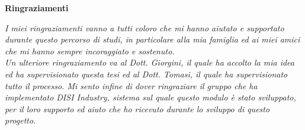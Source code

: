 \thispagestyle{empty}

\begin{center}
  {\bf \Huge Ringraziamenti}
\end{center}

\vspace{4cm}


\emph{
    I miei ringraziamenti vanno a tutti coloro che mi hanno aiutato e supportato durante questo percorso di studi, in particolare alla mia famiglia ed ai miei amici che mi hanno sempre incoraggiato e sostenuto.\\ Un ulteriore ringraziamento va al Dott. Giorgini, il quale ha accolto la mia idea ed ha supervisionato questa tesi ed al Dott. Tomasi, il quale ha supervisionato tutto il processo. Mi sento infine di dover ringraziare il gruppo che ha implementato DISI Industry, sistema sul quale questo modulo è stato sviluppato, per il loro supporto ed aiuto che ho ricevuto durante lo sviluppo di questo progetto.
}
